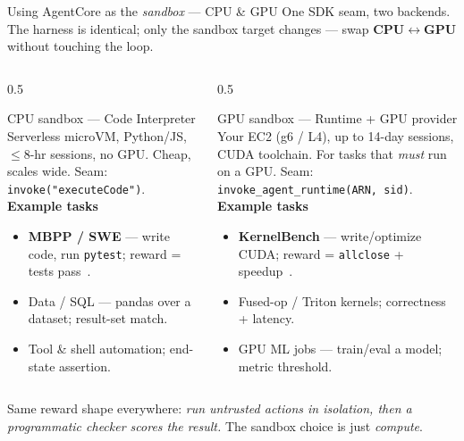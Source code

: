 \documentclass[aspectratio=169]{beamer}
\begin{document}
\begin{frame}{Using AgentCore as the \emph{sandbox} --- CPU \& GPU}
  \footnotesize One SDK seam, two backends. The harness is identical; only the sandbox target changes ---
  swap \textbf{CPU}$\leftrightarrow$\textbf{GPU} without touching the loop.
  \begin{columns}[T]
    \begin{column}{0.5\textwidth}
      \begin{block}{CPU sandbox --- Code Interpreter}
        \scriptsize Serverless microVM, Python/JS, $\le$8-hr sessions, no GPU. Cheap, scales wide.
        Seam: \texttt{invoke("executeCode")}.
        \vspace{0.2em}\\ \textbf{Example tasks}
        \begin{itemize}\setlength\itemsep{0.05em}
          \item \textbf{MBPP / SWE} --- write code, run \texttt{pytest}; reward = tests pass~\cite{mbpp,swebench}.
          \item Data / SQL --- pandas over a dataset; result-set match.
          \item Tool \& shell automation; end-state assertion.
        \end{itemize}
      \end{block}
    \end{column}
    \begin{column}{0.5\textwidth}
      \begin{block}{GPU sandbox --- Runtime + GPU provider}
        \scriptsize Your EC2 (g6 / L4), up to 14-day sessions, CUDA toolchain. For tasks that
        \emph{must} run on a GPU. Seam: \texttt{invoke\_agent\_runtime(ARN, sid)}.
        \vspace{0.2em}\\ \textbf{Example tasks}
        \begin{itemize}\setlength\itemsep{0.05em}
          \item \textbf{KernelBench} --- write/optimize CUDA; reward = \texttt{allclose} + speedup~\cite{kernelbench}.
          \item Fused-op / Triton kernels; correctness + latency.
          \item GPU ML jobs --- train/eval a model; metric threshold.
        \end{itemize}
      \end{block}
    \end{column}
  \end{columns}
  \vspace{0.2em}
  \footnotesize\centering Same reward shape everywhere: \emph{run untrusted actions in isolation, then a
  programmatic checker scores the result.} The sandbox choice is just \emph{compute}.
\end{frame}
\end{document}
